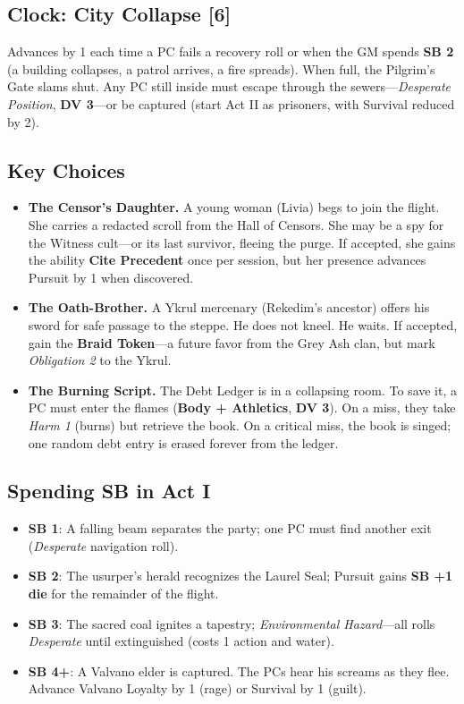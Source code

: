 \documentclass[11pt,a5paper]{book}
\newcommand{\sb}[1]{\textbf{SB #1}}
\newcommand{\dv}[1]{\textbf{DV #1}}
\newcommand{\clock}[1]{\textbf{[#1]}}
\newcommand{\trait}[1]{\textbf{#1}}
\newcommand{\condition}[1]{\textit{#1}}
\begin{document}
\subsection*{Clock: City Collapse \clock{6}}

Advances by 1 each time a PC fails a recovery roll or when the GM spends \sb{2} (a building collapses, a patrol arrives, a fire spreads). When full, the Pilgrim's Gate slams shut. Any PC still inside must escape through the sewers---\condition{Desperate Position}, \dv{3}---or be captured (start Act II as prisoners, with Survival reduced by 2).

\subsection*{Key Choices}

\begin{itemize}[leftmargin=*]
\item \textbf{The Censor's Daughter.} A young woman (Livia) begs to join the flight. She carries a redacted scroll from the Hall of Censors. She may be a spy for the Witness cult---or its last survivor, fleeing the purge. If accepted, she gains the ability \trait{Cite Precedent} once per session, but her presence advances Pursuit by 1 when discovered.
\item \textbf{The Oath-Brother.} A Ykrul mercenary (Rekedim's ancestor) offers his sword for safe passage to the steppe. He does not kneel. He waits. If accepted, gain the \textbf{Braid Token}---a future favor from the Grey Ash clan, but mark \condition{Obligation 2} to the Ykrul.
\item \textbf{The Burning Script.} The Debt Ledger is in a collapsing room. To save it, a PC must enter the flames (\textbf{Body + Athletics}, \dv{3}). On a miss, they take \condition{Harm 1} (burns) but retrieve the book. On a critical miss, the book is singed; one random debt entry is erased forever from the ledger.
\end{itemize}

\subsection*{Spending SB in Act I}

\begin{itemize}[leftmargin=*]
\item \sb{1}: A falling beam separates the party; one PC must find another exit (\condition{Desperate} navigation roll).
\item \sb{2}: The usurper's herald recognizes the Laurel Seal; Pursuit gains \sb{+1 die} for the remainder of the flight.
\item \sb{3}: The sacred coal ignites a tapestry; \condition{Environmental Hazard}---all rolls \condition{Desperate} until extinguished (costs 1 action and water).
\item \sb{4+}: A Valvano elder is captured. The PCs hear his screams as they flee. Advance Valvano Loyalty by 1 (rage) or Survival by 1 (guilt).
\end{itemize}
\end{document}
